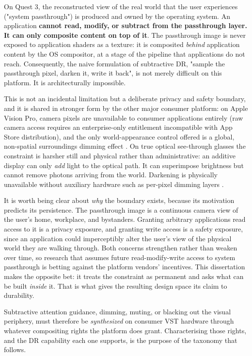 On Quest 3, the reconstructed view of the real world that the user experiences ("system passthrough")
is produced and owned by the operating system. An application \textbf{cannot read, modify, or subtract from
the passthrough layer. It can only composite content on top of it}. The passthrough image is never
exposed to application shaders as a texture: it is composited \textit{behind} application content by the OS
compositor, at a stage of the pipeline that applications do not reach. Consequently, the naive
formulation of subtractive DR, "sample the passthrough pixel, darken it, write it back", is not
merely difficult on this platform. It is architecturally impossible.

This is not an incidental limitation but a deliberate privacy and safety boundary, and it is shared
in stronger form by the other major consumer platform: on Apple Vision Pro, camera pixels are
unavailable to consumer applications entirely (raw camera access requires an enterprise-only
entitlement incompatible with App Store distribution), and the only world-appearance control offered
is a global, non-spatial surroundings dimming effect \citep{apple2024}. On true optical see-through
glasses the constraint is harsher still and physical rather than administrative: an additive display
can only \textit{add} light to the optical path. It can superimpose brightness but cannot remove photons
arriving from the world. Darkening is physically unavailable without auxiliary hardware such as
per-pixel dimming layers \citep{itoh2021}.

It is worth being clear about \textit{why} the boundary exists, because its motivation predicts its
persistence. The passthrough image is a continuous camera view of the user's home, workplace, and
bystanders. Granting arbitrary applications read access to it is a privacy exposure, and granting
write access is a safety exposure, since an application could imperceptibly alter the user's view of
the physical world they are walking through. Both concerns strengthen rather than weaken over time,
so research that assumes future read-modify-write access to system passthrough is betting against the
platform vendors' incentives. This dissertation makes the opposite bet: it treats the constraint as
permanent and asks what can be built \textit{inside} it. That is what gives the resulting design space
its claim to durability.

Subtractive attention guidance, dimming, muting, or blacking out the visual periphery, must
therefore be \textit{synthesized} on consumer VST hardware through whatever compositing rights the platform
does grant. Characterising those rights, and the DR capability each one supports, is the purpose of
the taxonomy that follows.

